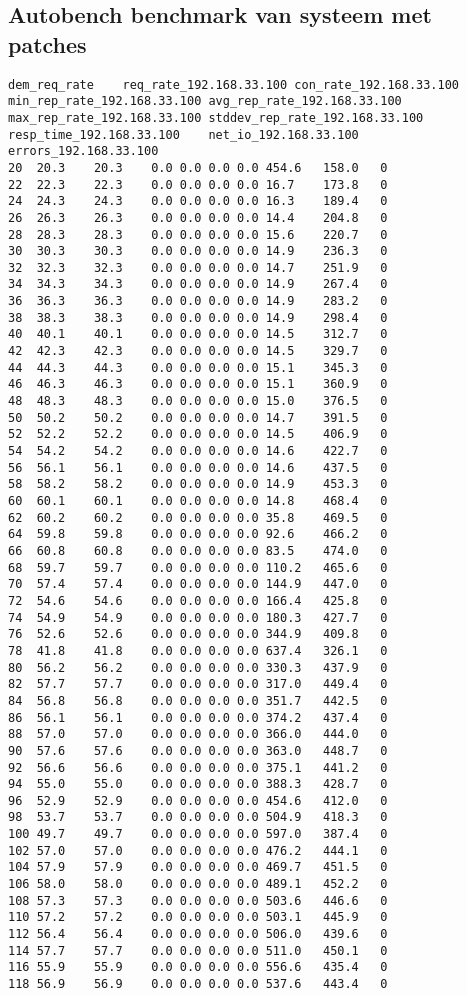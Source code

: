 \subsection{Autobench benchmark van systeem met patches}

\begin{lstlisting}[caption={Eerste 50 resultaten}, basicstyle=\footnotesize]
dem_req_rate	req_rate_192.168.33.100	con_rate_192.168.33.100	min_rep_rate_192.168.33.100	avg_rep_rate_192.168.33.100	max_rep_rate_192.168.33.100	stddev_rep_rate_192.168.33.100	resp_time_192.168.33.100	net_io_192.168.33.100	errors_192.168.33.100
20	20.3	20.3	0.0	0.0	0.0	0.0	454.6	158.0	0
22	22.3	22.3	0.0	0.0	0.0	0.0	16.7	173.8	0
24	24.3	24.3	0.0	0.0	0.0	0.0	16.3	189.4	0
26	26.3	26.3	0.0	0.0	0.0	0.0	14.4	204.8	0
28	28.3	28.3	0.0	0.0	0.0	0.0	15.6	220.7	0
30	30.3	30.3	0.0	0.0	0.0	0.0	14.9	236.3	0
32	32.3	32.3	0.0	0.0	0.0	0.0	14.7	251.9	0
34	34.3	34.3	0.0	0.0	0.0	0.0	14.9	267.4	0
36	36.3	36.3	0.0	0.0	0.0	0.0	14.9	283.2	0
38	38.3	38.3	0.0	0.0	0.0	0.0	14.9	298.4	0
40	40.1	40.1	0.0	0.0	0.0	0.0	14.5	312.7	0
42	42.3	42.3	0.0	0.0	0.0	0.0	14.5	329.7	0
44	44.3	44.3	0.0	0.0	0.0	0.0	15.1	345.3	0
46	46.3	46.3	0.0	0.0	0.0	0.0	15.1	360.9	0
48	48.3	48.3	0.0	0.0	0.0	0.0	15.0	376.5	0
50	50.2	50.2	0.0	0.0	0.0	0.0	14.7	391.5	0
52	52.2	52.2	0.0	0.0	0.0	0.0	14.5	406.9	0
54	54.2	54.2	0.0	0.0	0.0	0.0	14.6	422.7	0
56	56.1	56.1	0.0	0.0	0.0	0.0	14.6	437.5	0
58	58.2	58.2	0.0	0.0	0.0	0.0	14.9	453.3	0
60	60.1	60.1	0.0	0.0	0.0	0.0	14.8	468.4	0
62	60.2	60.2	0.0	0.0	0.0	0.0	35.8	469.5	0
64	59.8	59.8	0.0	0.0	0.0	0.0	92.6	466.2	0
66	60.8	60.8	0.0	0.0	0.0	0.0	83.5	474.0	0
68	59.7	59.7	0.0	0.0	0.0	0.0	110.2	465.6	0
70	57.4	57.4	0.0	0.0	0.0	0.0	144.9	447.0	0
72	54.6	54.6	0.0	0.0	0.0	0.0	166.4	425.8	0
74	54.9	54.9	0.0	0.0	0.0	0.0	180.3	427.7	0
76	52.6	52.6	0.0	0.0	0.0	0.0	344.9	409.8	0
78	41.8	41.8	0.0	0.0	0.0	0.0	637.4	326.1	0
80	56.2	56.2	0.0	0.0	0.0	0.0	330.3	437.9	0
82	57.7	57.7	0.0	0.0	0.0	0.0	317.0	449.4	0
84	56.8	56.8	0.0	0.0	0.0	0.0	351.7	442.5	0
86	56.1	56.1	0.0	0.0	0.0	0.0	374.2	437.4	0
88	57.0	57.0	0.0	0.0	0.0	0.0	366.0	444.0	0
90	57.6	57.6	0.0	0.0	0.0	0.0	363.0	448.7	0
92	56.6	56.6	0.0	0.0	0.0	0.0	375.1	441.2	0
94	55.0	55.0	0.0	0.0	0.0	0.0	388.3	428.7	0
96	52.9	52.9	0.0	0.0	0.0	0.0	454.6	412.0	0
98	53.7	53.7	0.0	0.0	0.0	0.0	504.9	418.3	0
100	49.7	49.7	0.0	0.0	0.0	0.0	597.0	387.4	0
102	57.0	57.0	0.0	0.0	0.0	0.0	476.2	444.1	0
104	57.9	57.9	0.0	0.0	0.0	0.0	469.7	451.5	0
106	58.0	58.0	0.0	0.0	0.0	0.0	489.1	452.2	0
108	57.3	57.3	0.0	0.0	0.0	0.0	503.6	446.6	0
110	57.2	57.2	0.0	0.0	0.0	0.0	503.1	445.9	0
112	56.4	56.4	0.0	0.0	0.0	0.0	506.0	439.6	0
114	57.7	57.7	0.0	0.0	0.0	0.0	511.0	450.1	0
116	55.9	55.9	0.0	0.0	0.0	0.0	556.6	435.4	0
118	56.9	56.9	0.0	0.0	0.0	0.0	537.6	443.4	0


\end{lstlisting}


